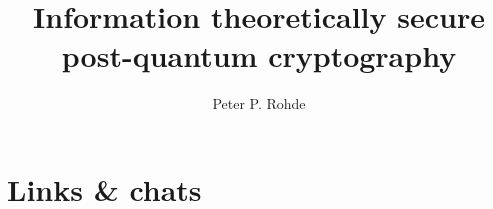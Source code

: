 \documentclass[twocolumn, aps, amsmath, amssymb, nofootinbib, superscriptaddress, longbibliography, doublefloatfix, table-of-contents, eqsecnum, rmp]{revtex4-2}
\begin{document}
\title{Information theoretically secure post-quantum cryptography}

\author{Peter P. Rohde}

\begin{abstract}
\end{abstract}

\maketitle

\tableofcontents

\section{Links \& chats}
\end{document}
